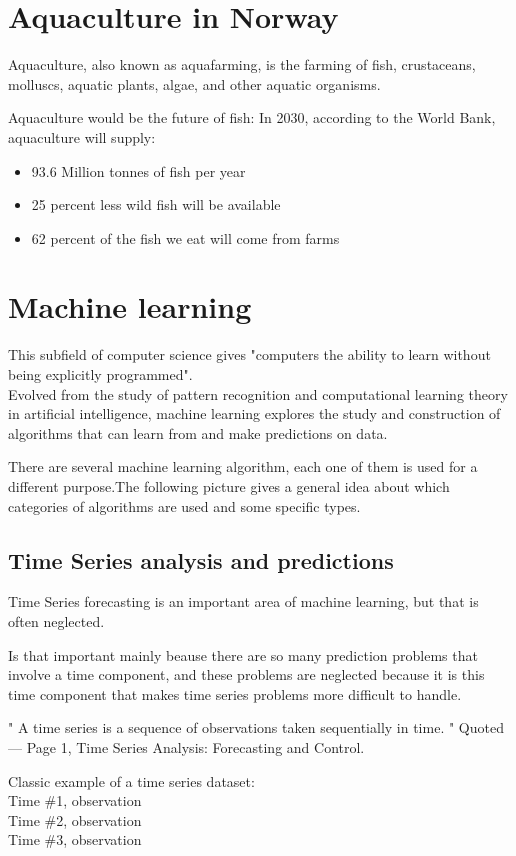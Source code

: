 \section{Aquaculture in Norway}
Aquaculture, also known as aquafarming, is the farming of fish, crustaceans, molluscs, aquatic plants, algae, and other aquatic organisms.

Aquaculture would be the future of fish:
In 2030, according to the World Bank, aquaculture will supply:
\begin{itemize}
\item 93.6 Million tonnes of fish per year
\item 25 percent less wild fish will be available
\item 62 percent of the fish we eat will come from farms
\end{itemize}


\section{Machine learning}
This subfield of computer science gives "computers the ability to learn without being explicitly programmed". \\Evolved from the study of pattern recognition and computational learning theory in artificial intelligence, machine learning explores the study and construction of algorithms that can learn from and make predictions on data.

There are several machine learning algorithm, each one of them is used for a different purpose.The following picture gives a general idea about which categories of algorithms are used and some specific types.


\subsection{Time Series analysis and predictions}
Time Series forecasting is an important area of machine learning, but that is often neglected.

Is that important mainly beause there are so many prediction problems that involve a time component, and these problems are neglected because it is this time component that makes time series problems more difficult to handle.

" A time series is a sequence of observations taken sequentially in time. "
Quoted — Page 1, Time Series Analysis: Forecasting and Control.

Classic example of a time series dataset:\\ 		
Time \#1, observation\\
Time \#2, observation\\
Time \#3, observation

